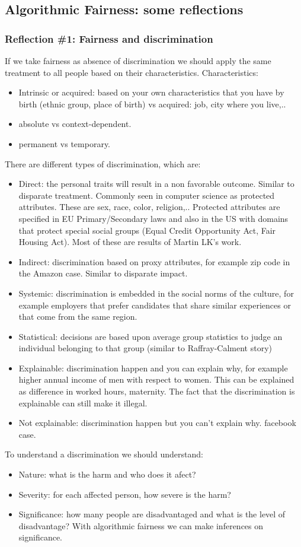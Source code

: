 \subsection{Algorithmic Fairness: some reflections}
\subsubsection{Reflection \#1: Fairness and discrimination}
If we take fairness as absence of discrimination we should apply the same treatment to all people based on their characteristics. Characteristics:
\begin{itemize}
    \item Intrinsic or acquired: based on your own characteristics that you have by birth (ethnic group, place of birth) vs acquired: job, city where you live,..
    \item absolute vs context-dependent.
    \item permanent vs temporary.
\end{itemize}
There are different types of discrimination, which are:
\begin{itemize}
    \item Direct: the personal traits will result in a non favorable outcome. Similar to disparate treatment. Commonly seen in computer science as protected attributes. These are sex, race, color, religion,.. Protected attributes are specified in EU Primary/Secondary laws and also in the US with domains that protect special social groups (Equal Credit Opportunity Act, Fair Housing Act). Most of these are results of Martin LK's work.
    \item Indirect: discrimination based on proxy attributes, for example zip code in the Amazon case. Similar to disparate impact.
    \item Systemic: discrimination is embedded in the social norms of the culture, for example employers that prefer candidates that share similar experiences or that come from the same region. 
    \item Statistical: decisions are based upon average group statistics to judge an individual belonging to that group (similar to Raffray-Calment story)
    \item Explainable: discrimination happen and you can explain why, for example higher annual income of men with respect to women. This can be explained as difference in worked hours, maternity. The fact that the discrimination is explainable can still make it illegal.
    \item Not explainable: discrimination happen but you can't explain why. facebook case.
\end{itemize}
To understand a discrimination we should understand:
\begin{itemize}
    \item Nature: what is the harm and who does it afect?
    \item Severity: for each affected person, how severe is the harm?
    \item Significance: how many people are disadvantaged and what is the level of disadvantage? With algorithmic fairness we can make inferences on significance.
\end{itemize}
